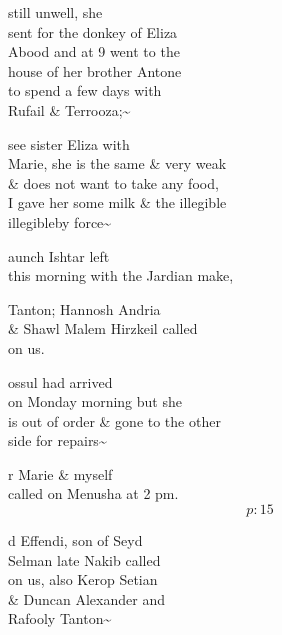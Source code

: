 \documentclass{report}
\begin{document}
	\par{
 	still unwell, she\ \\sent for the donkey of Eliza\ \\Abood and at 9 went to the\ \\house of her brother Antone\ \\to spend a few days with\ \\Rufail \& Terrooza;\~{}\ \\
	}

	\par{
 	see sister Eliza with\ \\Marie, she is the same \& very weak\ \\\& does not want to take any food,\ \\I gave her some milk \& the \lbrack illegible\rbrack\ \\\lbrack illegible\rbrack by force\~{}\ \\
	}

	\par{
 	aunch Ishtar left\ \\this morning with the Jardian make,\ \\
	}

	\par{
 	Tanton; Hannosh Andria\ \\\& Shawl Malem Hirzkeil called\ \\on us.\ \\
	}

	\par{
 	ossul had arrived\ \\on Monday morning but she\ \\is out of order \& gone to the other\ \\side for repairs\~{}\ \\
	}

	\par{
 	r Marie \& myself\ \\called on Menusha at 2 pm.\ \\
  \[p: 15 \]

	}






	\par{
 	d Effendi, son of Seyd\ \\Selman late Nakib called\ \\on us, also Kerop Setian\ \\\& Duncan Alexander and\ \\Rafooly Tanton\~{}\ \\
	}
\end{document}
